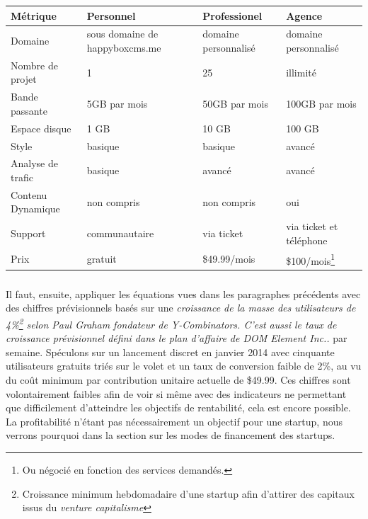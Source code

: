 \documentclass[11pt, a4paper ]{article}
\begin{document}
\begin{spacing}{1.5}
\begin{flushleft}
	\begin{tabular}{|l|l|l|l|}
		Métrique & Personnel & Professionel & Agence \\
		\hline
		Domaine & sous domaine de happyboxcms.me & domaine personnalisé & domaine personnalisé \\
		Nombre de projet & 1 & 25 & illimité \\
		Bande passante & 5GB par mois & 50GB par mois & 100GB par mois \\
		Espace disque & 1 GB & 10 GB & 100 GB \\
		Style & basique & basique & avancé \\
		Analyse de trafic & basique & avancé & avancé \\
		Contenu Dynamique & non compris & non compris & oui \\
		Support & communautaire & via ticket & via ticket et téléphone  \\
		Prix & gratuit & \$49.99/mois & \$100/mois\footnote{Ou négocié en fonction des services demandés.} \\

	\end{tabular}
\end{flushleft}
\subparagraph{}
Il faut, ensuite, appliquer les équations vues dans les paragraphes précédents avec des chiffres prévisionnels basés sur une \emph{croissance de la masse des utilisateurs de 4\%\footnote{Croissance minimum hebdomadaire d'une startup afin d'attirer des capitaux issus du \emph{venture capitalisme}} selon Paul Graham fondateur de Y-Combinators.
C'est aussi le taux de croissance prévisionnel défini dans le plan d'affaire de DOM Element Inc..} par semaine.
Spéculons sur un lancement discret en janvier 2014 avec cinquante utilisateurs gratuits triés sur le volet et un taux de conversion faible de 2\%, au vu du coût minimum par contribution unitaire actuelle de \$49.99. Ces chiffres sont volontairement faibles afin de voir si même avec des indicateurs ne permettant que difficilement d'atteindre les objectifs de rentabilité, cela est encore possible. La profitabilité n'étant pas nécessairement un objectif pour une startup, nous verrons pourquoi dans la section sur les modes de financement des startups.



\end{spacing}
\end{document}

